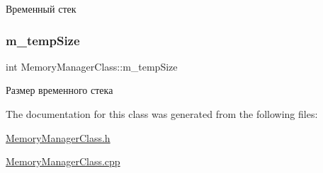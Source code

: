 Временный стек 

\mbox{\label{class_memory_manager_class_a95328b45da8d0823d1f4e5a0bc480cda}} 
\subsubsection{\texorpdfstring{m\+\_\+temp\+Size}{m\_tempSize}}
{\footnotesize\ttfamily int Memory\+Manager\+Class\+::m\+\_\+temp\+Size\hspace{0.3cm}{\ttfamily [private]}}



Размер временного стека 



The documentation for this class was generated from the following files\+:\begin{DoxyCompactItemize}
\item 
\hyperlink{_memory_manager_class_8h}{Memory\+Manager\+Class.\+h}\item 
\hyperlink{_memory_manager_class_8cpp}{Memory\+Manager\+Class.\+cpp}\end{DoxyCompactItemize}
